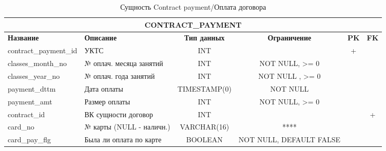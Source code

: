 \documentclass[a4paper]{article}
\begin{document}
\begin{table}[!hbt]
	\begin{tabularx}{\textwidth}{|l|X|c|c|c|c|}
		\hline
		\multicolumn{6}{|c|}{\textbf{CONTRACT\_PAYMENT}}                                                                                    \\ \hline
		\textbf{Название}     & \textbf{Описание}                  & \textbf{Тип данных} & \textbf{Ограничение} & \textbf{PK} & \textbf{FK} \\ \hline
		contract\_payment\_id & УКТС        & INT                 &                      & +           &             \\ \hline
		classes\_month\_no    & № оплач. месяца занятий & INT                 & NOT NULL, >= 0             &             &             \\ \hline
		classes\_year\_no     & № оплач. года занятий   & INT                 & NOT NULL , >= 0            &             &             \\ \hline
		payment\_dttm           & Дата оплаты                        & TIMESTAMP(0)        & NOT NULL             &             &             \\ \hline
		payment\_amt          & Размер оплаты                      & INT                 & NOT NULL, >= 0            &             &             \\ \hline
		contract\_id          & ВК сущности договор                & INT                 &                      &             & +           \\ \hline
		card\_no & № карты (NULL - наличн.) & VARCHAR(16) & **** & & \\ \hline
		card\_pay\_flg & Была ли оплата по карте & BOOLEAN & NOT NULL, DEFAULT FALSE & & \\ \hline
	\end{tabularx}
	\caption{Сущность Contract payment/Оплата договора}
\end{table}
\end{document}
